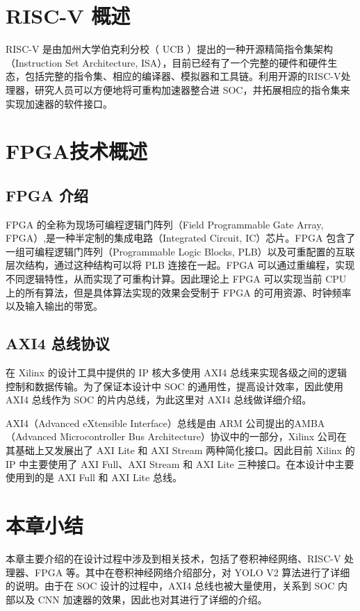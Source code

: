 \section{RISC-V 概述}
RISC-V 是由加州大学伯克利分校（ UCB ）提出的一种开源精简指令集架构（Instruction Set Architecture, ISA）\citep{waterman2011risc}，目前已经有了一个完整的硬件和硬件生态\citep{asanovic2014instruction}，包括完整的指令集、相应的编译器、模拟器和工具链。利用开源的RISC-V处理器，研究人员可以方便地将可重构加速器整合进 SOC，并拓展相应的指令集来实现加速器的软件接口。

\section{FPGA技术概述}

\subsection{FPGA 介绍}

FPGA 的全称为现场可编程逻辑门阵列（Field Programmable Gate Array, FPGA）,是一种半定制的集成电路（Integrated Circuit, IC）芯片。FPGA 包含了一组可编程逻辑门阵列（Programmable Logic Blocks, PLB）以及可重配置的互联层次结构，通过这种结构可以将 PLB 连接在一起。FPGA 可以通过重编程，实现不同逻辑特性，从而实现了可重构计算。因此理论上 FPGA 可以实现当前 CPU 上的所有算法，但是具体算法实现的效果会受制于 FPGA 的可用资源、时钟频率以及输入输出的带宽。

\subsection{AXI4 总线协议}

在 Xilinx 的设计工具中提供的 IP 核大多使用 AXI4 总线来实现各级之间的逻辑控制和数据传输。为了保证本设计中 SOC 的通用性，提高设计效率，因此使用 AXI4 总线作为 SOC 的片内总线，为此这里对 AXI4 总线做详细介绍。

AXI4（Advanced eXtensible Interface）总线是由 ARM 公司提出的AMBA（Advanced Microcontroller Bus Architecture）协议中的一部分，Xilinx 公司在其基础上又发展出了 AXI Lite 和 AXI Stream 两种简化接口。因此目前 Xilinx 的 IP 中主要使用了 AXI Full、AXI Stream 和 AXI Lite 三种接口。在本设计中主要使用到的是 AXI Full 和 AXI Lite 总线。



\section{本章小结}

本章主要介绍的在设计过程中涉及到相关技术，包括了卷积神经网络、RISC-V 处理器、FPGA 等。其中在卷积神经网络介绍部分，对 YOLO V2 算法进行了详细的说明。由于在 SOC 设计的过程中，AXI4 总线也被大量使用，关系到 SOC 内部以及 CNN 加速器的效果，因此也对其进行了详细的介绍。

